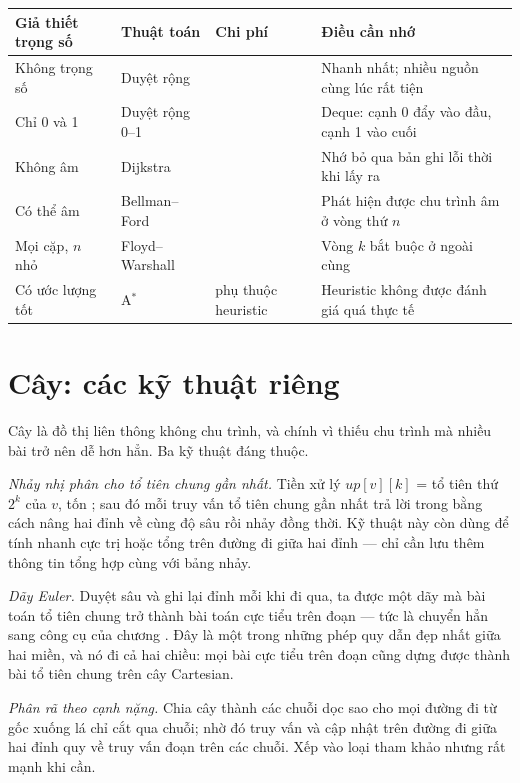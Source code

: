 \documentclass[../../algorithm.tex]{subfiles}
\begin{document}
\begin{center}\footnotesize
\begin{tabularx}{\linewidth}{@{}L{3.1cm}L{2.6cm}L{2.6cm}Y@{}}
\toprule
\textbf{Giả thiết trọng số} & \textbf{Thuật toán} & \textbf{Chi phí} & \textbf{Điều cần nhớ}\\
\midrule
Không trọng số & Duyệt rộng &  & Nhanh nhất; nhiều nguồn cùng lúc rất tiện\\
Chỉ 0 và 1 & Duyệt rộng 0--1 &  & Deque: cạnh 0 đẩy vào đầu, cạnh 1 vào cuối\\
Không âm & Dijkstra &  & Nhớ bỏ qua bản ghi lỗi thời khi lấy ra\\
Có thể âm & Bellman--Ford &  & Phát hiện được chu trình âm ở vòng thứ \(n\)\\
Mọi cặp, \(n\) nhỏ & Floyd--Warshall &  & Vòng \(k\) bắt buộc ở ngoài cùng\\
Có ước lượng tốt & A\(^\ast\) & phụ thuộc heuristic & Heuristic không được đánh giá quá thực tế\\
\bottomrule
\end{tabularx}
\end{center}

\section{Cây: các kỹ thuật riêng}

Cây là đồ thị liên thông không chu trình, và chính vì thiếu chu trình mà nhiều bài trở nên dễ hơn hẳn. Ba kỹ thuật đáng thuộc.

\emph{Nhảy nhị phân cho tổ tiên chung gần nhất.} Tiền xử lý \(up[v][k]\) = tổ tiên thứ \(2^k\) của \(v\), tốn ; sau đó mỗi truy vấn tổ tiên chung gần nhất trả lời trong  bằng cách nâng hai đỉnh về cùng độ sâu rồi nhảy đồng thời. Kỹ thuật này còn dùng để tính nhanh cực trị hoặc tổng trên đường đi giữa hai đỉnh --- chỉ cần lưu thêm thông tin tổng hợp cùng với bảng nhảy.

\emph{Dãy Euler.} Duyệt sâu và ghi lại đỉnh mỗi khi đi qua, ta được một dãy mà bài toán tổ tiên chung trở thành bài toán cực tiểu trên đoạn --- tức là chuyển hẳn sang công cụ của chương . Đây là một trong những phép quy dẫn đẹp nhất giữa hai miền, và nó đi cả hai chiều: mọi bài cực tiểu trên đoạn cũng dựng được thành bài tổ tiên chung trên cây Cartesian.

\emph{Phân rã theo cạnh nặng.} Chia cây thành các chuỗi dọc sao cho mọi đường đi từ gốc xuống lá chỉ cắt qua  chuỗi; nhờ đó truy vấn và cập nhật trên đường đi giữa hai đỉnh quy về  truy vấn đoạn trên các chuỗi. Xếp vào loại tham khảo nhưng rất mạnh khi cần.
\end{document}
